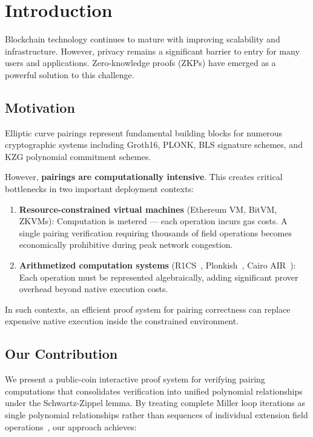 \section{Introduction}

Blockchain technology continues to mature with improving scalability and infrastructure. However, privacy remains a significant barrier to entry for many users and applications. Zero-knowledge proofs (ZKPs) have emerged as a powerful solution to this challenge.

\subsection{Motivation}

Elliptic curve pairings represent fundamental building blocks for numerous cryptographic systems including Groth16\cite{EC:Groth16}, PLONK\cite{EPRINT:GabWilCio19}, BLS signature schemes\cite{bls05}, and KZG polynomial commitment schemes\cite{AC:KatZavGol10}.

However, \textbf{pairings are computationally intensive}. This creates critical bottlenecks in two important deployment contexts:

\begin{enumerate}
\item \textbf{Resource-constrained virtual machines} (Ethereum VM, BitVM, ZKVMs): Computation is metered — each operation incurs gas costs. A single pairing verification requiring thousands of field operations becomes economically prohibitive during peak network congestion.

\item \textbf{Arithmetized computation systems} (R1CS~\cite{EC:GGPR13}, Plonkish~\cite{EPRINT:GabWilCio19}, Cairo AIR~\cite{EPRINT:GolPapRia21}): Each operation must be represented algebraically, adding significant prover overhead beyond native execution costs.
\end{enumerate}

In such contexts, an efficient proof system for pairing correctness can replace expensive native execution inside the constrained environment.

\subsection{Our Contribution}

We present a public-coin interactive proof system for verifying pairing computations that consolidates verification into unified polynomial relationships under the Schwartz-Zippel lemma. By treating complete Miller loop iterations as single polynomial relationships rather than sequences of individual extension field operations~\cite{FXFM23}, our approach achieves:

